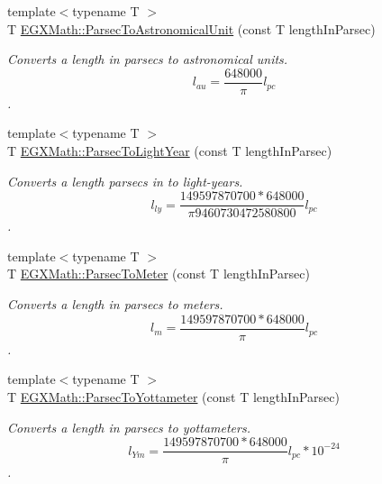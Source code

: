 \begin{DoxyCompactItemize}
\item 
{\footnotesize template$<$typename T $>$ }\\T \mbox{\hyperlink{group___e_g_x_math-_conversions-_length_conversions-_astronomical-_parsec-_astronomical_ga635dd871156c8bdd5e27198ba323380c}{E\+G\+X\+Math\+::\+Parsec\+To\+Astronomical\+Unit}} (const T length\+In\+Parsec)
\begin{DoxyCompactList}\small\item\em Converts a length in parsecs to astronomical units. \[ l_{au}= \frac{648000}{\pi} l_{pc} \]. \end{DoxyCompactList}\item 
{\footnotesize template$<$typename T $>$ }\\T \mbox{\hyperlink{group___e_g_x_math-_conversions-_length_conversions-_astronomical-_parsec-_astronomical_gaf6681b9c24d89c83c48bf6dabb9a433d}{E\+G\+X\+Math\+::\+Parsec\+To\+Light\+Year}} (const T length\+In\+Parsec)
\begin{DoxyCompactList}\small\item\em Converts a length parsecs in to light-\/years. \[ l_{ly}= \frac{149597870700 * 648000}{\pi 9460730472580800} l_{pc} \]. \end{DoxyCompactList}\item 
{\footnotesize template$<$typename T $>$ }\\T \mbox{\hyperlink{group___e_g_x_math-_conversions-_length_conversions-_astronomical-_parsec-_s_i_gaa97ff0501ce04074bf9aacafc2135532}{E\+G\+X\+Math\+::\+Parsec\+To\+Meter}} (const T length\+In\+Parsec)
\begin{DoxyCompactList}\small\item\em Converts a length in parsecs to meters. \[ l_{m}=\frac{149597870700 * 648000}{\pi}l_{pc} \]. \end{DoxyCompactList}\item 
{\footnotesize template$<$typename T $>$ }\\T \mbox{\hyperlink{group___e_g_x_math-_conversions-_length_conversions-_astronomical-_parsec-_s_i_ga8a5381e5fcaa36d464b5bdf17e238ef2}{E\+G\+X\+Math\+::\+Parsec\+To\+Yottameter}} (const T length\+In\+Parsec)
\begin{DoxyCompactList}\small\item\em Converts a length in parsecs to yottameters. \[ l_{Ym}=\frac{149597870700 * 648000}{\pi}l_{pc} * 10^{-24} \]. \end{DoxyCompactList}\item 

\end{DoxyCompactItemize}
